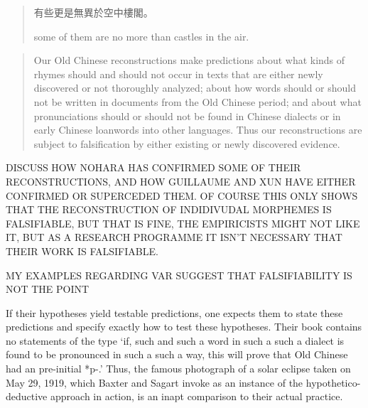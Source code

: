 %
\begin{quote}
有些更是無異於空中樓閣。

some of them are 
no more than castles in the air. 
\end{quote}

\begin{quote}
Our Old Chinese reconstructions make predictions about what kinds
of rhymes should and should not occur in texts that are either newly discovered
or not thoroughly analyzed; about how words should or should not be written in
documents from the Old Chinese period; and about what pronunciations should or
should not be found in Chinese dialects or in early Chinese loanwords into other
languages. Thus our reconstructions are subject to falsification by either existing or
newly discovered evidence.
\citep[5-6]{Baxter2014OldChinese}
\end{quote}


DISCUSS HOW NOHARA HAS CONFIRMED SOME OF THEIR RECONSTRUCTIONS, AND HOW GUILLAUME AND XUN HAVE EITHER CONFIRMED OR SUPERCEDED THEM. OF COURSE THIS ONLY SHOWS THAT THE RECONSTRUCTION OF INDIDIVUDAL MORPHEMES IS FALSIFIABLE, BUT THAT IS FINE, THE EMPIRICISTS MIGHT NOT LIKE IT, BUT AS A RESEARCH PROGRAMME IT ISN'T NECESSARY THAT THEIR WORK IS FALSIFIABLE. 

MY EXAMPLES REGARDING VAR SUGGEST THAT FALSIFIABILITY IS NOT THE POINT 

If their  hypotheses yield testable predictions, one expects them to state these predictions and specify exactly how to test these hypotheses. Their book contains no statements of the type `if, such and such a word in such a such a dialect is found to be pronounced in such a such a way, this will prove that Old Chinese had an pre-initial *p-.'  
Thus, the famous photograph of a solar eclipse taken on May 29, 1919, 
which Baxter and Sagart invoke as an instance of the hypothetico-deductive approach in action, is an inapt comparison to their actual practice. 

